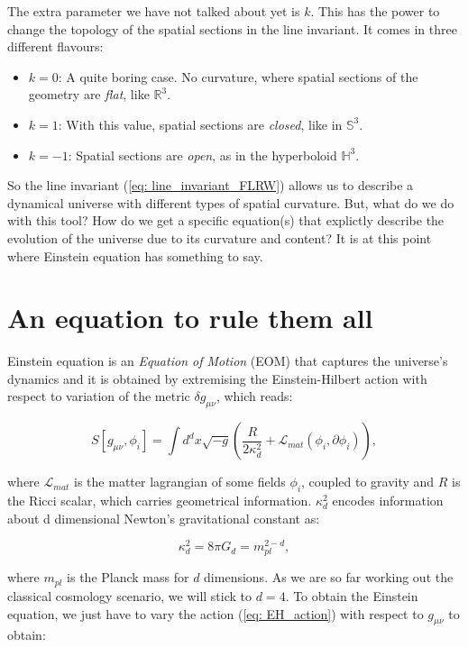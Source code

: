 \documentclass[11pt, a4paper]{article} %
\renewcommand{\it}{\textit}
\begin{document}
The extra parameter we have not talked about yet is $k$. This has the power to change the topology of the spatial sections in the line invariant. It comes in three different flavours:

\begin{itemize}
	\item $k = 0$: A quite boring case. No curvature, where spatial sections of the geometry are \it{flat}, like $\mathbb{R}^{3}$.
	\item $k = 1$: With this value, spatial sections are \it{closed}, like in $\mathbb{S}^{3}$.
	\item $k = -1$: Spatial sections are \it{open}, as in the hyperboloid $\mathbb{H}^{3}$.
\end{itemize}

So the line invariant (\ref{eq: line_invariant_FLRW}) allows us to describe a dynamical universe with different types of spatial curvature. But, what do we do with this tool? How do we get a specific equation(s) that explictly describe the evolution of the universe due to its curvature and content? It is at this point where Einstein equation has something to say.

\section*{An equation to rule them all}

Einstein equation is an \textit{Equation of Motion} (EOM) that captures the universe's dynamics and it is obtained by extremising the Einstein-Hilbert action with respect to variation of the metric $\delta g_{\mu\nu}$, which reads:

\begin{equation}\label{eq: EH_action}
	S[g_{\mu\nu}, \phi_{i}] = \int d^{d}x \sqrt{-g} \left(\frac{R}{2 \kappa^{2}_{d}} + \mathcal{L}_{mat}(\phi_{i}, \partial \phi_{i})\right), 
\end{equation}

where $\mathcal{L}_{mat}$ is the matter lagrangian of some fields $\phi_{i}$, coupled to gravity and $R$ is the Ricci scalar, which carries geometrical information. $\kappa^{2}_{d}$ encodes information about d dimensional Newton's gravitational constant as:

\begin{equation}
	\kappa^{2}_{d} = 8 \pi G_{d} = m_{pl}^{2-d},
\end{equation}

where $m_{pl}$ is the Planck mass for $d$ dimensions. As we are so far working out the classical cosmology scenario, we will stick to $d = 4$. To obtain the Einstein equation, we just have to vary the action (\ref{eq: EH_action}) with respect to $g_{\mu \nu}$ to obtain:
\end{document}
